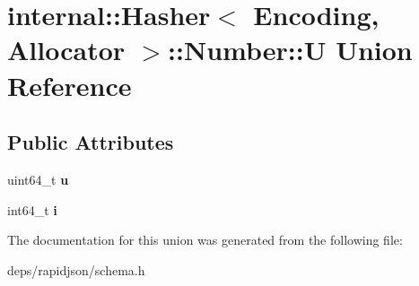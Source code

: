\hypertarget{unioninternal_1_1_hasher_1_1_number_1_1_u}{}\section{internal\+:\+:Hasher$<$ Encoding, Allocator $>$\+:\+:Number\+:\+:U Union Reference}
\label{unioninternal_1_1_hasher_1_1_number_1_1_u}
\subsection*{Public Attributes}
\begin{DoxyCompactItemize}
\item 
uint64\+\_\+t {\bfseries u}\hypertarget{unioninternal_1_1_hasher_1_1_number_1_1_u_a6380a48b72a4bb5dd7291d47814e6421}{}\label{unioninternal_1_1_hasher_1_1_number_1_1_u_a6380a48b72a4bb5dd7291d47814e6421}

\item 
int64\+\_\+t {\bfseries i}\hypertarget{unioninternal_1_1_hasher_1_1_number_1_1_u_a19099b91768e67f02ed5a27fc157974b}{}\label{unioninternal_1_1_hasher_1_1_number_1_1_u_a19099b91768e67f02ed5a27fc157974b}

\end{DoxyCompactItemize}


The documentation for this union was generated from the following file\+:\begin{DoxyCompactItemize}
\item 
deps/rapidjson/schema.\+h\end{DoxyCompactItemize}
